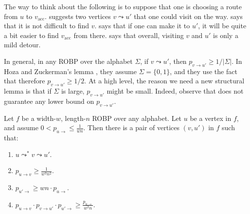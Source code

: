 The way to think about the following  is to suppose that one is choosing a route from $u$ to $v_{\text{acc}}$.  suggests two vertices $v \leadsto u'$ that one could visit on the way.  says that it is not difficult to find $v$.  says that if one can make it to $u'$, it will be quite a bit easier to find $v_{\text{acc}}$ from there.  says that overall, visiting $v$ and $u'$ is only a mild detour.

In general, in any ROBP over the alphabet $\Sigma$, if $v \leadsto u'$, then $p_{v \to u'} \geq 1/|\Sigma|$. In Hoza and Zuckerman's lemma \cite[Lemma 1]{HZ20}, they assume $\Sigma = \{0, 1\}$, and they use the fact that therefore $p_{v \to u'} \geq 1/2$. At a high level, the reason we need a new structural lemma is that if $\Sigma$ is large, $p_{v \to u'}$ might be small. Indeed, observe that  does not guarantee any lower bound on $p_{v \to u'}$.

\begin{lemma} \label{lem:structural}
Let $f$ be a width-$w$, length-$n$ ROBP over any alphabet. Let $u$ be a vertex in $f$, and assume $0 < p_{u \to} \leq \frac{1}{wn}$. Then there is a pair of vertices $(v, u')$ in $f$ such that:
\begin{enumerate}
\item $u \leadsto^* v \leadsto u'$. \label{item:preceding}
\item $p_{u \to v} \geq \frac{1}{w^3 n^2}$. \label{item:noticeable}
\item $p_{u' \to} \geq wn \cdot p_{u \to}$. \label{item:improvement}
\item $p_{u \to v} \cdot p_{v \to u'} \cdot p_{u' \to} \geq \frac{p_{u \to}}{w^2 n}$. \label{item:chain}
\end{enumerate}
\end{lemma}


